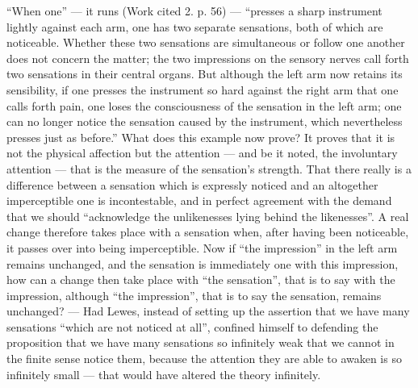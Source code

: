 \documentclass[12pt,a4paper]{book}
\begin{document}
``When one'' --- it runs (Work cited 2. p. 56) --- ``presses a sharp instrument
lightly against each arm, one has two separate sensations, both of which are
noticeable. Whether these two sensations are simultaneous or follow one another does
not concern the matter; the two impressions on the sensory nerves call%
\setcounter{footnote}{0}%
forth two sensations in their central organs. But although the left arm now retains
its sensibility, if one presses the instrument so hard against the right arm that one
calls forth pain, one loses the consciousness of the sensation in the left arm; one
can no longer notice the sensation caused by the instrument, which nevertheless
presses just as before.'' What does this example now prove? It proves that it is not
the physical affection but the attention --- and be it noted, the involuntary
attention --- that is the measure of the sensation's strength. That there really is a
difference between a sensation which is expressly noticed and an altogether
imperceptible one is incontestable, and in perfect agreement with the demand that we
should ``acknowledge the unlikenesses lying behind the likenesses''. A real change
therefore takes place with a sensation when, after having been noticeable, it passes
over into being imperceptible. Now if ``the impression'' in the left arm remains
unchanged, and the sensation is immediately one with this impression, how can a change
then take place with ``the sensation'', that is to say with the impression, although
``the impression'', that is to say the sensation, remains unchanged? --- Had Lewes,
instead of setting up the assertion that we have many sensations ``which are not
noticed at all'', confined himself to defending the proposition that we have many
sensations so infinitely weak that we cannot in the finite sense notice them, because
the attention they are able to awaken is so infinitely small --- that would have
altered the theory infinitely.
\end{document}
